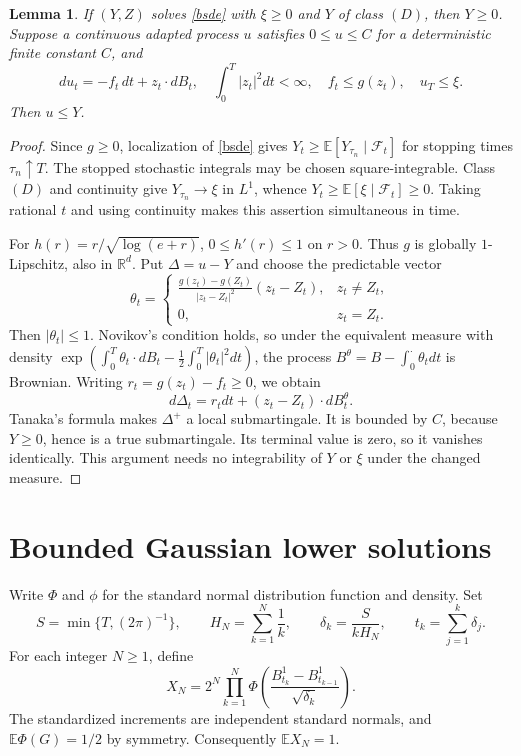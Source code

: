\documentclass[11pt]{article}
\newtheorem{lemma}{Lemma}
\newcommand{\E}{\mathbb E}
\newcommand{\F}{\mathcal F}
\newcommand{\R}{\mathbb R}
\begin{document}
\begin{lemma}\label{comparison}
If $(Y,Z)$ solves \eqref{bsde} with $\xi\geq0$ and $Y$ of class $(D)$,
then $Y\geq0$. Suppose a continuous adapted process $u$ satisfies
$0\leq u\leq C$ for a deterministic finite constant $C$, and
\[
 du_t=-f_t\,dt+z_t\cdot dB_t,
 \quad \int_0^T|z_t|^2dt<\infty,
 \quad f_t\leq g(z_t),\quad u_T\leq\xi.
\]
Then $u\leq Y$.
\end{lemma}
\begin{proof}
Since $g\geq0$, localization of \eqref{bsde} gives
$Y_t\geq\E[Y_{\tau_n}\mid\F_t]$ for stopping times $\tau_n\uparrow T$.
The stopped stochastic integrals may be chosen square-integrable.
Class $(D)$ and continuity give $Y_{\tau_n}\to\xi$ in $L^1$, whence
$Y_t\geq\E[\xi\mid\F_t]\geq0$. Taking rational $t$ and using continuity
makes this assertion simultaneous in time.

For $h(r)=r/\sqrt{\log(e+r)}$, $0\leq h'(r)\leq1$ on $r>0$.
Thus $g$ is globally $1$-Lipschitz, also in $\R^d$.
Put $\Delta=u-Y$ and choose the predictable vector
\[
 \theta_t=\begin{cases}
 \displaystyle\frac{g(z_t)-g(Z_t)}{|z_t-Z_t|^2}(z_t-Z_t),&z_t\ne Z_t,\\
 0,&z_t=Z_t.
 \end{cases}
\]
Then $|\theta_t|\leq1$. Novikov's condition holds, so under the equivalent
measure with density
$\exp(\int_0^T\theta_t\cdot dB_t-\frac12\int_0^T|\theta_t|^2dt)$,
the process $B^{\theta}=B-\int_0^{\cdot}\theta_tdt$ is Brownian. Writing
$r_t=g(z_t)-f_t\geq0$, we obtain
\[
 d\Delta_t=r_tdt+(z_t-Z_t)\cdot dB_t^{\theta}.
\]
Tanaka's formula makes $\Delta^+$ a local submartingale. It is bounded
by $C$, because $Y\geq0$, hence is a true submartingale. Its terminal
value is zero, so it vanishes identically. This argument needs no
integrability of $Y$ or $\xi$ under the changed measure.
\end{proof}

\section*{Bounded Gaussian lower solutions}
Write $\Phi$ and $\phi$ for the standard normal distribution function
and density. Set
\[
 S=\min\{T,(2\pi)^{-1}\},\qquad
 H_N=\sum_{k=1}^N\frac1k,\qquad
 \delta_k=\frac{S}{kH_N},\qquad t_k=\sum_{j=1}^k\delta_j.
\]
For each integer $N\geq1$, define
\begin{equation}\label{terminalN}
 X_N=2^N\prod_{k=1}^N
 \Phi\left(\frac{B^1_{t_k}-B^1_{t_{k-1}}}{\sqrt{\delta_k}}\right).
\end{equation}
The standardized increments are independent standard normals, and
$\E\Phi(G)=1/2$ by symmetry. Consequently $\E X_N=1$.
\end{document}
